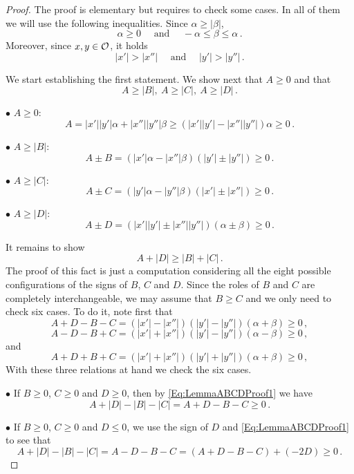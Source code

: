 \begin{proof} The proof is elementary but requires to check some cases. In all of them we will use the following inequalities. Since $\alpha \geq |\beta |$,
$$
\alpha\geq 0 \quad \textrm{ and } \quad  -\alpha \leq \beta \leq \alpha\,.
$$
Moreover, since $x,y\in\mathcal{O}$, it holds
$$
|x'|>|x''| \quad \textrm{ and } \quad |y'|>|y''|\,.
$$


We start establishing the first statement. We show next that $A\geq 0$ and that
$$
A \geq |B|, \ A \geq |C| ,\ A \geq |D|\,.
$$


$\bullet$ $A \geq 0$:
$$
 A =  |x'||y'|  \alpha + |x''||y''|\beta \geq (|x'||y'|  - |x''||y''|)\alpha \geq 0\,.
$$

$\bullet$ $A \geq |B|$:
$$
A\pm B = (|x'|\alpha-|x''|\beta)(|y'|\pm |y''|) \geq 0\,.
$$

$\bullet$ $A \geq |C|$:
$$
A\pm C = (|y'|\alpha-|y''|\beta)(|x'|\pm |x''|)  \geq 0\,.
$$

$\bullet$ $A \geq |D|$:
$$
A\pm D = (|x'||y'| \pm |x''||y''|)(\alpha \pm \beta) \geq 0\,.
$$


It remains to show
$$
A + |D| \geq |B| + |C|\,.
$$
The proof of this fact is just a computation considering all the eight possible configurations of
the signs of $B$, $C$ and $D$. Since the roles of $B$ and $C$ are completely interchangeable, we
may assume that $B \geq C$ and we only need to check six cases. To do it, note first that
\begin{equation}
\label{Eq:LemmaABCDProof1}
A + D - B - C = (|x'|-|x''|)(|y'|-|y''|)(\alpha + \beta) \geq 0 \,,
\end{equation}
\begin{equation}
\label{Eq:LemmaABCDProof2}
A - D - B + C = (|x'|+|x''|)(|y'|-|y''|)(\alpha - \beta) \geq 0 \,,
\end{equation}
and
\begin{equation}
\label{Eq:LemmaABCDProof3}
A + D + B + C = (|x'|+|x''|)(|y'|+|y''|)(\alpha + \beta) \geq 0 \,,
\end{equation}
With these three relations at hand we check the six cases.

$\bullet$ If $B \geq 0$, $C \geq 0$ and $D \geq 0$, then by \eqref{Eq:LemmaABCDProof1} we have
$$
A + |D| - |B| - |C| = A + D - B - C \geq 0\,.
$$

$\bullet$ If $B \geq 0$, $C \geq 0$ and $D \leq 0$, we use the sign of $D$ and \eqref{Eq:LemmaABCDProof1} to
see that
$$
A + |D| - |B| - |C| = A - D - B - C =  (A + D - B - C) + (-2D) \geq 0\,.
$$


\end{proof}

